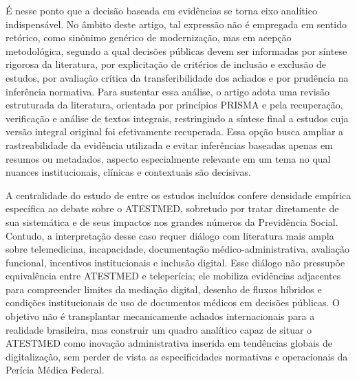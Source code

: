 \documentclass[12pt,a4paper]{article}
\begin{document}
É nesse ponto que a decisão baseada em evidências se torna eixo analítico indispensável. No âmbito deste artigo, tal expressão não é empregada em sentido retórico, como sinônimo genérico de modernização, mas em acepção metodológica, segundo a qual decisões públicas devem ser informadas por síntese rigorosa da literatura, por explicitação de critérios de inclusão e exclusão de estudos, por avaliação crítica da transferibilidade dos achados e por prudência na inferência normativa. Para sustentar essa análise, o artigo adota uma revisão estruturada da literatura, orientada por princípios PRISMA e pela recuperação, verificação e análise de textos integrais, restringindo a síntese final a estudos cuja versão integral original foi efetivamente recuperada. Essa opção busca ampliar a rastreabilidade da evidência utilizada e evitar inferências baseadas apenas em resumos ou metadados, aspecto especialmente relevante em um tema no qual nuances institucionais, clínicas e contextuais são decisivas.

A centralidade do estudo de \textcite{soares20241031t0000000000asistematicadoatestmednaconcessa} entre os estudos incluídos confere densidade empírica específica ao debate sobre o ATESTMED, sobretudo por tratar diretamente de sua sistemática e de seus impactos nos grandes números da Previdência Social. Contudo, a interpretação desse caso requer diálogo com literatura mais ampla sobre telemedicina, incapacidade, documentação médico-administrativa, avaliação funcional, incentivos institucionais e inclusão digital. Esse diálogo não pressupõe equivalência entre ATESTMED e teleperícia; ele mobiliza evidências adjacentes para compreender limites da mediação digital, desenho de fluxos híbridos e condições institucionais de uso de documentos médicos em decisões públicas. O objetivo não é transplantar mecanicamente achados internacionais para a realidade brasileira, mas construir um quadro analítico capaz de situar o ATESTMED como inovação administrativa inserida em tendências globais de digitalização, sem perder de vista as especificidades normativas e operacionais da Perícia Médica Federal.
\end{document}
